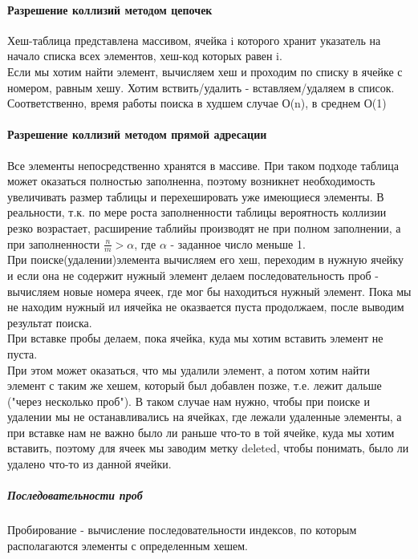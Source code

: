 \documentclass[a4paper,10pt]{article}
\begin{document}
\paragraph{Разрешение коллизий методом цепочек}
Хеш-таблица представлена массивом, ячейка i которого хранит указатель на начало списка всех элементов, хеш-код которых равен i.\\
Если мы хотим найти элемент, вычисляем хеш и проходим по списку в ячейке с номером, равным хешу. Хотим вствить/удалить - вставляем/удаляем в список.\\
Соответственно, время работы поиска в худшем случае О(n), в среднем О(1)\\
\paragraph{Разрешение коллизий методом прямой адресации}
Все элементы непосредственно хранятся в массиве. При таком подходе таблица может оказаться полностью заполненна, поэтому возникнет необходимость увеличивать размер таблицы и перехешировать уже имеющиеся элементы. В реальности, т.к. по мере роста заполненности таблицы вероятность коллизии резко возрастает, расширение таблийы производят не при полном заполнении, а при заполненности $\frac{n}{m} > \alpha$, где $\alpha$ - заданное число меньше 1.\\
При поиске(удалении)элемента вычисляем его хеш, переходим в нужную ячейку и если она не содержит нужный элемент делаем последовательность проб - вычисляем новые номера ячеек, где мог бы находиться нужный элемент. Пока мы не находим нужный ил иячейка не оказвается пуста продолжаем, после выводим результат поиска.\\
При вставке пробы делаем, пока ячейка, куда мы хотим вставить элемент не пуста.\\
При этом может оказаться, что мы удалили элемент, а потом хотим найти элемент с таким же хешем, который был добавлен позже, т.е. лежит дальше ("через несколько проб"). В таком случае нам нужно, чтобы при поиске и удалении мы не останавливались на ячейках, где лежали удаленные элементы, а при вставке нам не важно было ли раньше что-то в той ячейке, куда мы хотим вставить, поэтому для ячеек мы заводим метку deleted, чтобы понимать, было ли удалено что-то из данной ячейки.\\
\subparagraph{Последовательности проб}
Пробирование - вычисление последовательности индексов, по которым располагаются элементы с определенным хешем.
\end{document}
